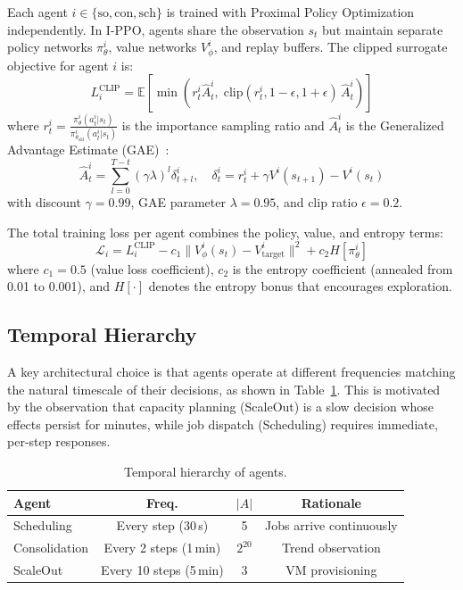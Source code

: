 \documentclass[conference]{IEEEtran}
\begin{document}
Each agent $i \in \{\text{so}, \text{con}, \text{sch}\}$ is trained with
Proximal Policy Optimization~\cite{schulman2017ppo} independently.  In I-PPO,
agents share the observation $s_t$ but maintain separate policy networks
$\pi^i_\theta$, value networks $V^i_\phi$, and replay buffers.  The
clipped surrogate objective for agent $i$ is:
\begin{equation}
  L^{\text{CLIP}}_i = \mathbb{E}\left[\min\left(
    r^i_t \hat{A}^i_t,\;
    \text{clip}(r^i_t, 1{-}\epsilon, 1{+}\epsilon)\,\hat{A}^i_t
  \right)\right]
\end{equation}
where $r^i_t = \frac{\pi^i_\theta(a^i_t|s_t)}{\pi^i_{\theta_{\text{old}}}(a^i_t|s_t)}$
is the importance sampling ratio and $\hat{A}^i_t$ is the Generalized Advantage
Estimate (GAE)~\cite{schulman2016gae}:
\begin{equation}
  \hat{A}^i_t = \sum_{l=0}^{T-t} (\gamma\lambda)^l \delta^i_{t+l}, \quad
  \delta^i_t = r^i_t + \gamma V^i(s_{t+1}) - V^i(s_t)
\end{equation}
with discount $\gamma=0.99$, GAE parameter $\lambda=0.95$, and clip ratio
$\epsilon=0.2$.

The total training loss per agent combines the policy, value, and entropy terms:
\begin{equation}
  \mathcal{L}_i = L^{\text{CLIP}}_i - c_1 \|V^i_\phi(s_t) - V^i_{\text{target}}\|^2 + c_2 H[\pi^i_\theta]
\end{equation}
where $c_1 = 0.5$ (value loss coefficient), $c_2$ is the entropy coefficient
(annealed from 0.01 to 0.001), and $H[\cdot]$ denotes the entropy bonus that
encourages exploration.

\subsection{Temporal Hierarchy}

A key architectural choice is that agents operate at different frequencies
matching the natural timescale of their decisions, as shown in
Table~\ref{tab:hierarchy}.  This is motivated by the observation that
capacity planning (ScaleOut) is a slow decision whose effects persist for
minutes, while job dispatch (Scheduling) requires immediate, per-step
responses.

\begin{table}[h]
\centering
\caption{Temporal hierarchy of agents.}
\label{tab:hierarchy}
\begin{tabular}{lccc}
\toprule
\textbf{Agent} & \textbf{Freq.} & \textbf{$|A|$} & \textbf{Rationale} \\
\midrule
Scheduling   & Every step (30\,s) & 5         & Jobs arrive continuously \\
Consolidation& Every 2 steps (1\,min)& $2^{20}$ & Trend observation \\
ScaleOut     & Every 10 steps (5\,min)& 3        & VM provisioning \\
\bottomrule
\end{tabular}
\end{table}
\end{document}
